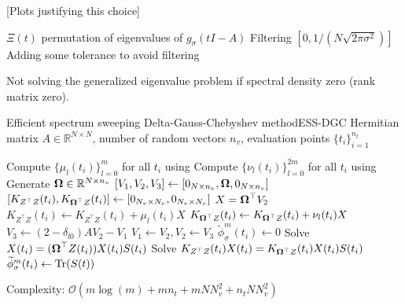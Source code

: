 [Plots justifying this choice]

$\Xi(t)$ permutation of eigenvalues of $g_{\sigma}(tI - A)$
Filtering $[0, 1 / (N \sqrt{2 \pi \sigma^2})]$ \cite{lin2017randomized}
Adding some tolerance to avoid filtering

Not solving the generalized eigenvalue problem if spectral density zero (rank matrix zero).

\begin{algo}{Efficient spectrum sweeping Delta-Gauss-Chebyshev method}{ESS-DGC}
    Hermitian matrix $A \in \mathbb{R}^{N \times N}$, number of random vectors $n_v$,
    evaluation points $\{t_i\}_{i=1}^{n_t}$
    \begin{algorithmic}[1]
        \State Compute $\{\mu_l(t_i)\}_{l=0}^m$ for all $t_i$ using 
        \State Compute $\{\nu_l(t_i)\}_{l=0}^{2m}$ for all $t_i$ using 
        \State Generate $\boldsymbol{\Omega} \in \mathbb{R}^{N \times n_v}$
        \State $[V_1, V_2, V_3] \gets [0_{N \times n_v}, \boldsymbol{\Omega}, 0_{N \times n_v}]$
        \State $[K_{Z^{\top}Z}(t_i), K_{\boldsymbol{\Omega}^{\top}Z}(t_i)] \gets [0_{N_v \times N_v}, 0_{N_v \times N_v}]$
          \State $X = \boldsymbol{\Omega}^{\top} V_2$
              \State $K_{Z^{\top}Z}(t_i) \gets K_{Z^{\top}Z}(t_i) + \mu_l(t_i) X$
            \EndIf
            \State $K_{\boldsymbol{\Omega}^{\top}Z}(t_i) \gets K_{\boldsymbol{\Omega}^{\top}Z}(t_i) + \nu_l(t_i) X$
          \EndFor
          \State $V_3 \gets (2 - \delta_{l0}) A V_2 - V_1$ 
          \State $V_1 \gets V_2, V_2 \gets V_3$
        \EndFor
            \State $\widetilde{\phi}_{\sigma}^m(t_i) \gets 0$
          \Else
            \State Solve $ X(t_i) = (\boldsymbol{\Omega}^{\top} Z(t_i)) X(t_i) S(t_i)$
            \State Solve $K_{Z^{\top}Z}(t_i) X(t_i) = K_{\boldsymbol{\Omega}^{\top}Z}(t_i) X(t_i) S(t_i)$
            \State $\widetilde{\phi}_{\sigma}^m(t_i) \gets \operatorname{Tr}(S(t))$
          \EndIf
        \EndFor
    \end{algorithmic}
\end{algo}

Complexity: $\mathcal{O}(m \log(m) + m n_t + m N N_v^2 + n_t N N_v^2)$


